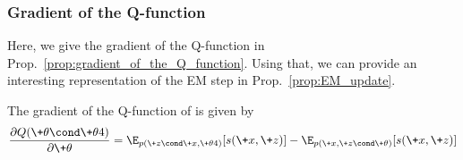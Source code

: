 \documentclass{article} %
\newcommand{\sufficientStatsFunction}{s}
\begin{document}
    



\subsubsection{Gradient of the Q-function}

 Here, we give the gradient of the Q-function in Prop.~\ref{prop:gradient_of_the_Q_function}. Using that, we can provide an interesting representation of the EM step  in Prop.~\ref{prop:EM_update}. 


\begin{proposition}
 The gradient of the Q-function of 
is given by 
 \begin{align}
 \frac{\partial Q(\+\theta \cond \+\theta^^t)}{\partial \+\theta} =  \E_{p(\+z \cond \+x, \+\theta^^t)}[\sufficientStatsFunction(\+x,\+z)] - 	\E_{p(\+x, \+z \cond \+\theta)}[\sufficientStatsFunction(\+x,\+z)]
 \label{eqn:gradient_of_Q_function_for_EM}
 \end{align}
%
\label{prop:gradient_of_the_Q_function}
 \end{proposition}
\end{document}
